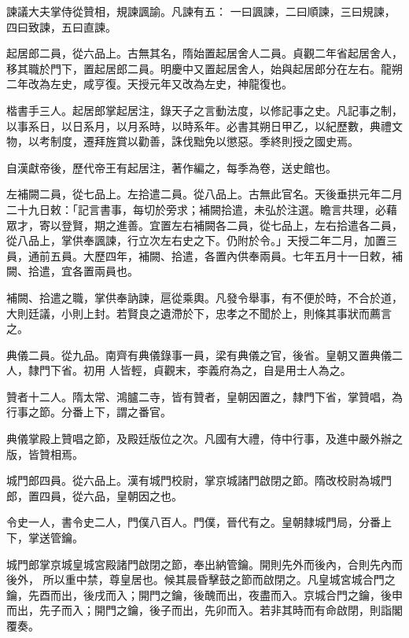 \begin{pinyinscope}
 諫議大夫掌侍從贊相，規諫諷諭。凡諫有五：
 一曰諷諫，二曰順諫，三曰規諫，四曰致諫，五曰直諫。



 起居郎二員，從六品上。古無其名，隋始置起居舍人二員。貞觀二年省起居舍人，移其職於門下，置起居郎二員。明慶中又置起居舍人，始與起居郎分在左右。龍朔二年改為左史，咸亨復。天授元年又改為左史，神龍復也。



 楷書手三人。起居郎掌起居注，錄天子之言動法度，以修記事之史。凡記事之制，以事系日，以日系月，以月系時，以時系年。必書其朔日甲乙，以紀歷數，典禮文物，以考制度，遷拜旌賞以勸善，誅伐黜免以懲惡。季終則授之國史焉。



 自漢獻帝後，歷代帝王有起居注，著作編之，每季為卷，送史館也。



 左補闕二員，從七品上。左拾遣二員。從八品上。古無此官名。天後垂拱元年二月二十九日敕：「記言書事，每切於旁求；補闕拾遣，未弘於注選。瞻言共理，必藉眾才，寄以登賢，期之進善。宜置左右補闕各二員，從七品上，左右拾遣各二員，從八品上，掌供奉諷諫，行立次左右史之下。仍附於令。」天授二年二月，加置三員，通前五員。大歷四年，補闕、拾遣，各置內供奉兩員。七年五月十一日敕，補闕、拾遣，宜各置兩員也。



 補闕、拾遣之職，掌供奉訥諫，扈從乘輿。凡發令舉事，有不便於時，不合於道，大則廷議，小則上封。若賢良之遺滯於下，忠孝之不聞於上，則條其事狀而薦言之。



 典儀二員。從九品。南齊有典儀錄事一員，梁有典儀之官，後省。皇朝又置典儀二人，隸門下省。初用
 人皆輕，貞觀末，李義府為之，自是用士人為之。



 贊者十二人。隋太常、鴻臚二寺，皆有贊者，皇朝因置之，隸門下省，掌贊唱，為行事之節。分番上下，謂之番官。



 典儀掌殿上贊唱之節，及殿廷版位之次。凡國有大禮，侍中行事，及進中嚴外辦之版，皆贊相焉。



 城門郎四員。從六品上。漢有城門校尉，掌京城諸門啟閉之節。隋改校尉為城門郎，置四員，從六品，皇朝因之也。



 令史一人，書令史二人，門僕八百人。門僕，晉代有之。皇朝隸城門局，分番上下，掌送管鑰。



 城門郎掌京城皇城宮殿諸門啟閉之節，奉出納管鑰。開則先外而後內，合則先內而後外，
 所以重中禁，尊皇居也。候其晨昏擊鼓之節而啟閉之。凡皇城宮城合門之鑰，先酉而出，後戌而入；開門之鑰，後醜而出，夜盡而入。京城合門之鑰，後申而出，先子而入；開門之鑰，後子而出，先卯而入。若非其時而有命啟閉，則詣閣覆奏。




\end{pinyinscope}
